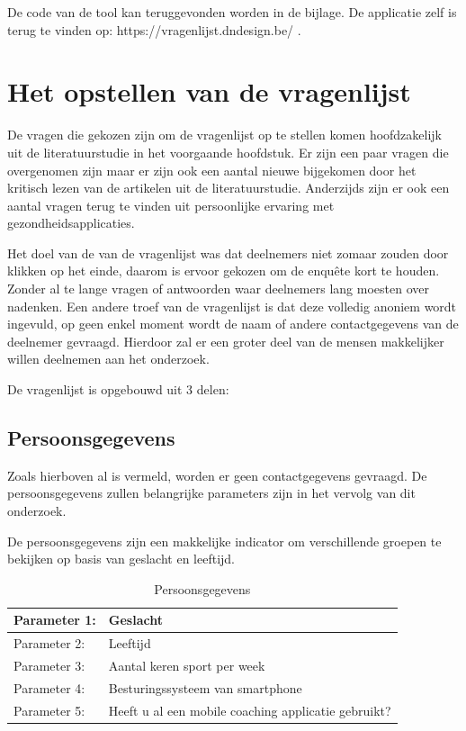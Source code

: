 De code van de tool kan teruggevonden worden in de bijlage. De applicatie zelf is terug te vinden op: https://vragenlijst.dndesign.be/ .

\section{Het opstellen van de vragenlijst}
\label{sec:opstellen-vragenlijst}

De vragen die gekozen zijn om de vragenlijst op te stellen komen hoofdzakelijk uit de literatuurstudie in het voorgaande hoofdstuk. Er zijn een paar vragen die overgenomen zijn maar er zijn ook een aantal nieuwe bijgekomen door het kritisch lezen van de artikelen uit de literatuurstudie. Anderzijds zijn er ook een aantal vragen terug te vinden uit persoonlijke ervaring met gezondheidsapplicaties. 

Het doel van de van de vragenlijst was dat deelnemers niet zomaar zouden door klikken op het einde, daarom is ervoor gekozen om de enquête kort te houden. Zonder al te lange vragen of antwoorden waar deelnemers lang moesten over nadenken. 
Een andere troef van de vragenlijst is dat deze volledig anoniem wordt ingevuld, op geen enkel moment wordt de naam of andere contactgegevens van de deelnemer gevraagd. Hierdoor zal er een groter deel van de mensen makkelijker willen deelnemen aan het onderzoek.

De vragenlijst is opgebouwd uit 3 delen: 

\subsection{Persoonsgegevens}

Zoals hierboven al is vermeld, worden er geen contactgegevens gevraagd. De persoonsgegevens zullen belangrijke parameters zijn in het vervolg van dit onderzoek. 

De persoonsgegevens zijn een makkelijke indicator om verschillende groepen te bekijken op basis van geslacht en leeftijd. 

\begin{table}[h!]
\begin{center}
\begin{tabular}{ |p{3cm}|p{7cm}| }
 \hline
 Parameter 1:   & Geslacht  \\
 \hline
Parameter 2: &   Leeftijd   \\
 \hline
 Parameter 3: &   Aantal keren sport per week   \\
 \hline
 Parameter 4: &  Besturingssysteem van smartphone   \\
 \hline
   Parameter 5: & Heeft u al een mobile coaching applicatie gebruikt? \\
 \hline
\end{tabular}
\end{center}
\caption{Persoonsgegevens}
\label{table:1}
\end{table}
\newpage


